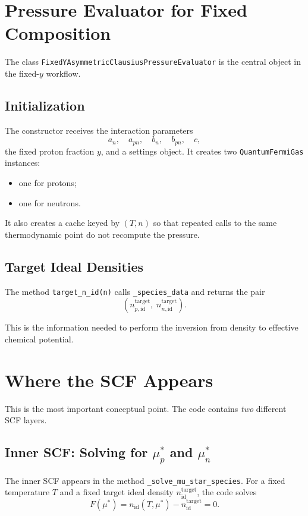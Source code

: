 \documentclass[11pt]{article}
\begin{document}
\section{Pressure Evaluator for Fixed Composition}

The class \texttt{FixedYAsymmetricClausiusPressureEvaluator} is the central
object in the fixed-$y$ workflow.

\subsection{Initialization}

The constructor receives the interaction parameters
\[
a_n,\quad a_{pn},\quad b_n,\quad b_{pn},\quad c,
\]
the fixed proton fraction $y$, and a settings object. It creates two
\texttt{QuantumFermiGas} instances:
\begin{itemize}
\item one for protons;
\item one for neutrons.
\end{itemize}

It also creates a cache keyed by $(T,n)$ so that repeated calls to the same
thermodynamic point do not recompute the pressure.

\subsection{Target Ideal Densities}

The method \texttt{target\_n\_id(n)} calls \texttt{\_species\_data} and returns
the pair
\[
\left(n_{p,\mathrm{id}}^{\mathrm{target}},\;
n_{n,\mathrm{id}}^{\mathrm{target}}\right).
\]

This is the information needed to perform the inversion from density to
effective chemical potential.

\section{Where the SCF Appears}

This is the most important conceptual point. The code contains \emph{two}
different SCF layers.

\subsection{Inner SCF: Solving for \texorpdfstring{$\mu_p^\ast$}{mu*p} and \texorpdfstring{$\mu_n^\ast$}{mu*n}}

The inner SCF appears in the method
\texttt{\_solve\_mu\_star\_species}. For a fixed temperature $T$ and a fixed
target ideal density $n_{\mathrm{id}}^{\mathrm{target}}$, the code solves
\begin{equation}
F(\mu^\ast) =
n_{\mathrm{id}}(T,\mu^\ast) - n_{\mathrm{id}}^{\mathrm{target}} = 0.
\end{equation}
\end{document}
